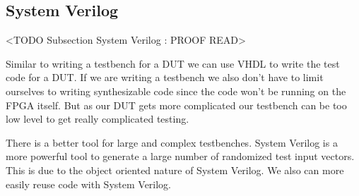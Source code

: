 \subsection{System Verilog}
	<TODO Subsection System Verilog : PROOF READ>

Similar to writing a testbench for a \ac{DUT} we can use \ac{VHDL} to write the test code for a \ac{DUT}. If we are writing a testbench we also don't have to limit ourselves to writing synthesizable code since the code won't be running on the \ac{FPGA} itself. But as our \ac{DUT} gets more complicated our testbench can be too low level to get really complicated testing. 

There is a better tool for large and complex testbenches. System Verilog is a more powerful tool to generate a large number of randomized test input vectors. This is due to the object oriented nature of System Verilog. We also can more easily reuse code with System Verilog. 
